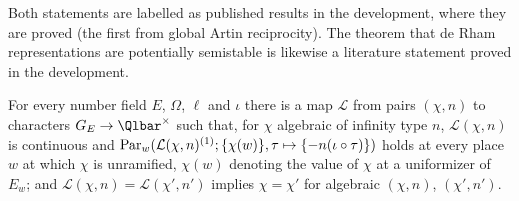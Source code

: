 Both statements are labelled as published results in the development, where they are proved (the
first from global Artin reciprocity). The theorem that de Rham representations are potentially
semistable \cite{Berger2002} is likewise a literature statement proved in the development.

\begin{proposition}[(S15)]\label{pf:geo:charex}
For every number field $E$, $\Omega$, $\ell$ and $\iota$ there is a map $\mathcal L$ from pairs $(\chi,n)$ to
characters $G_E\to\Qlbar^\times$ such that, for $\chi$ algebraic of infinity type $n$, $\mathcal L(\chi,n)$ is
continuous and $\mathrm{Par}_w(\mathcal L(\chi,n)^{(1)};\{\chi(w)\},\tau\mapsto\{-n(\iota\circ\tau)\})$ holds at every place
$w$ at which $\chi$ is unramified, $\chi(w)$ denoting the value of $\chi$ at a uniformizer of $E_w$; and
$\mathcal L(\chi,n)=\mathcal L(\chi',n')$ implies $\chi=\chi'$ for algebraic $(\chi,n)$, $(\chi',n')$.
\end{proposition}

